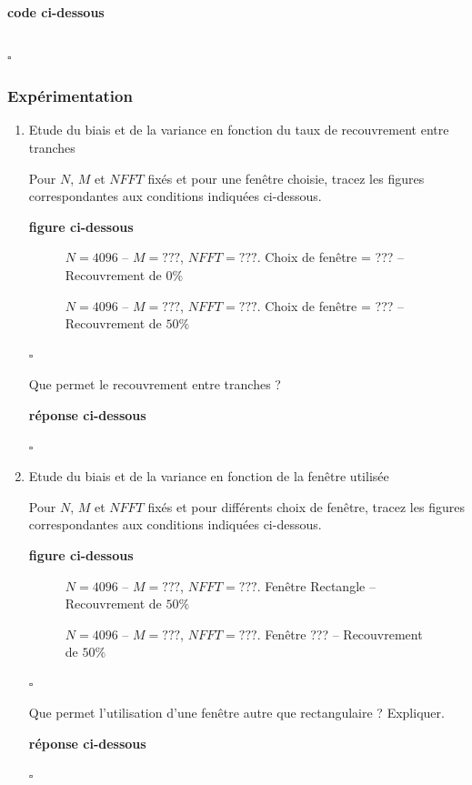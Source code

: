 \documentclass{article}
\newcommand{\debutrep}[1]{\color{blue}\begin{center} \hrulefill \textbf{ #1 } \hrulefill \end{center} }
\newcommand{\finrep}{\vspace*{5mm}\hfill $\square$\color{black}\vspace*{5mm}}
\begin{document}
\debutrep{code ci-dessous}
\begin{verbatim}

\end{verbatim}
\finrep

\subsubsection{Expérimentation}

\begin{enumerate}
\renewcommand{\theenumi}{\Alph{enumi}}

\item Etude du biais et de la variance en fonction du taux de recouvrement entre tranches

Pour $N$, $M$ et $NFFT$ fixés et pour une  fenêtre choisie,  tracez les figures correspondantes aux conditions indiquées ci-dessous.

\debutrep{figure ci-dessous}
\begin{figure}[h]

\caption{$N = 4096$ -- $M = ???$, $NFFT = ???$. Choix de fenêtre = ??? -- Recouvrement de $0\%$}
\end{figure}

\begin{figure}[h]

\caption{$N = 4096$ -- $M = ???$, $NFFT = ???$. Choix de fenêtre = ??? -- Recouvrement de $50\%$}
\end{figure}

\finrep

Que permet le recouvrement entre tranches ?

\debutrep{réponse ci-dessous}

\finrep

\item Etude du biais et de la variance en fonction de la fenêtre utilisée

Pour $N$, $M$ et $NFFT$ fixés et pour différents choix de fenêtre,  tracez les figures correspondantes aux conditions indiquées ci-dessous.

\debutrep{figure ci-dessous}
\begin{figure}[h]

\caption{$N = 4096$ -- $M = ???$, $NFFT = ???$. Fenêtre Rectangle -- Recouvrement de $50\%$}
\end{figure}

\begin{figure}[h]

\caption{$N = 4096$ -- $M = ???$, $NFFT = ???$. Fenêtre ??? -- Recouvrement de $50\%$}
\end{figure}

\finrep

Que permet l'utilisation d'une fenêtre autre que rectangulaire ? Expliquer.

\debutrep{réponse ci-dessous}

\finrep

\end{enumerate}
\end{document}

